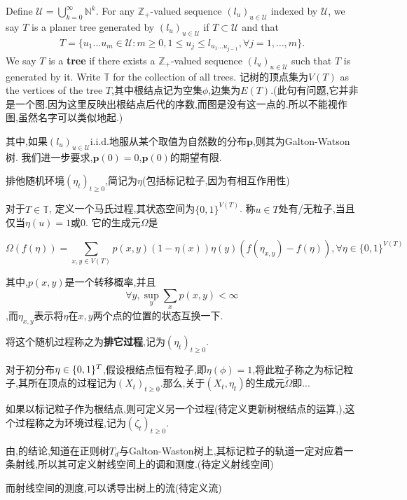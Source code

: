 \documentclass[a4paper,oneside]{ctexbook}
\begin{document}
			Define $\mathcal U = \bigcup_{k=0}^\infty \mathbb N^{k}$.
			For any  $\mathbb Z_+$-valued sequence $(l_u)_{u \in \mathcal U}$ indexed by $\mathcal U$, we say $T$ is a planer tree generated by $(l_u)_{u \in \mathcal U}$ if $T \subset \mathcal U$ and that
			\begin{align}
			T 
			= \{ u_1\dots u_m \in \mathcal U: m \geq 0, 1 \le u_j \leq l_{u_1 \dots u_{j-1}}, \forall j = 1,\dots, m\}.
			\end{align}
			We say $T$ is a \textbf{tree} if there exists a $\mathbb Z_+$-valued sequence $(l_u)_{u \in \mathcal U}$ such that $T$ is generated by it. Write $\mathbb T$ for the collection of all trees. 
			记树的顶点集为$V(T)$ as the vertices of the tree $T$,其中根结点记为空集$\phi$,边集为$E(T)$.(此句有问题,它并非是一个图.因为这里反映出根结点后代的序数,而图是没有这一点的.所以不能视作图,虽然名字可以类似地起.)
			
			其中,如果$(l_u)_{u \in \mathcal U}$i.i.d.地服从某个取值为自然数的分布$\mathbf{p}$,则其为Galton-Watson树.
			我们进一步要求,$\mathbf{p}({0})=0$,$\mathbf{p}({0})$的期望有限.

			排他随机环境$(\eta_t)_{t \ge 0}$,简记为$\eta$(包括标记粒子,因为有相互作用性)

			对于$T \in \mathbb T$, 定义一个马氏过程,其状态空间为$\{0,1\}^{V(T)}$. 称$u \in T$处有/无粒子,当且仅当$\eta(u) = 1$或$0$.
			它的生成元$\Omega$是 

			$$\Omega(f(\eta)) = \sum_{x,y \in V(T)} p(x,y) (1-\eta(x)) \eta(y) (f(\eta_{x,y}) - f(\eta)),\forall \eta \in \{0,1\}^{V(T)}$$

			其中,$p(x,y)$是一个转移概率,并且$$\forall y, \sup_y \sum_x p(x,y) < \infty$$,而$\eta_{x,y}$表示将$\eta$在$x,y$两个点的位置的状态互换一下.

			将这个随机过程称之为\textbf{排它过程},记为$(\eta_t)_{t\ge0}$.
			 
			对于初分布$\eta \in \mathbf \{0,1\}^{T}$,假设根结点恒有粒子,即$\eta(\phi) = 1$,将此粒子称之为标记粒子,其所在顶点的过程记为$(X_t)_{t \ge 0}$.那么,关于$(X_t,\eta_t)$的生成元$\widetilde{\Omega}$即...

			如果以标记粒子作为根结点,则可定义另一个过程(待定义更新树根结点的运算,),这个过程称之为环境过程,记为$(\zeta_t)_{t\ge0}$.

			由\cite{CCGS19},\cite{GS19}的结论,知道在正则树$T_d$与Galton-Waston树上,其标记粒子的轨道一定对应着一条射线,所以其可定义射线空间上的调和测度.(待定义射线空间)

			而射线空间的测度,可以诱导出树上的流(待定义流)
\end{document}

